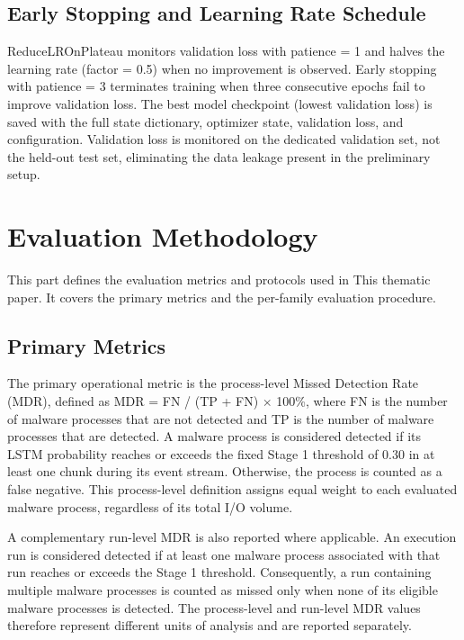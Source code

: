 \subsection{Early Stopping and Learning Rate Schedule}\label{sec:3.6.4}

ReduceLROnPlateau monitors validation loss with patience = 1 and halves the learning rate (factor = 0.5) when no improvement is observed. Early stopping with patience = 3 terminates training \cite{ref47} when three consecutive epochs fail to improve validation loss. The best model checkpoint (lowest validation loss) is saved with the full state dictionary, optimizer state, validation loss, and configuration. Validation loss is monitored on the dedicated validation set, not the held-out test set, eliminating the data leakage present in the preliminary setup.

\section{Evaluation Methodology}\label{sec:3.7}

This part defines the evaluation metrics and protocols used in This thematic paper. It covers the primary metrics and the per-family evaluation procedure.

\subsection{Primary Metrics}\label{sec:3.7.1}

The primary operational metric is the process-level Missed Detection Rate (MDR), defined as MDR = FN /\allowbreak{} (TP + FN) $\times$ 100\%, where FN is the number of malware processes that are not detected and TP is the number of malware processes that are detected. A malware process is considered detected if its \textmu{}LSTM probability reaches or exceeds the fixed Stage 1 threshold of 0.30 in at least one chunk during its event stream. Otherwise, the process is counted as a false negative. This process-level definition assigns equal weight to each evaluated malware process, regardless of its total I/\allowbreak{}O volume.

A complementary run-level MDR is also reported where applicable. An execution run is considered detected if at least one malware process associated with that run reaches or exceeds the Stage 1 threshold. Consequently, a run containing multiple malware processes is counted as missed only when none of its eligible malware processes is detected. The process-level and run-level MDR values therefore represent different units of analysis and are reported separately.


